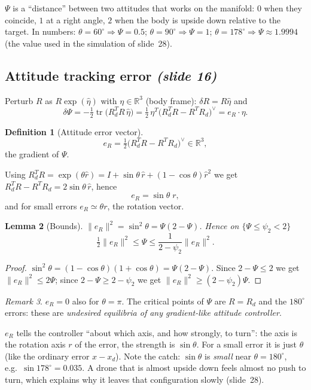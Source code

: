 \documentclass[11pt,a4paper]{article}
\newcommand{\R}{\mathbb{R}}
\newcommand{\tr}{\operatorname{tr}}
\newcommand{\hatm}[1]{\widehat{#1}}          %
\newcommand{\VEE}{^{\vee}}
\newcommand{\eR}{e_R}
\newcommand{\sli}[1]{\emph{(#1)}}
\theoremstyle{definition}
\newtheorem{definition}{Definition}[section]
\theoremstyle{plain}
\newtheorem{lemma}[definition]{Lemma}
\theoremstyle{remark}
\newtheorem{remark}[definition]{Remark}
\begin{document}
\begin{intuition}
$\Psi$ is a ``distance'' between two attitudes that works on the manifold: $0$ when they coincide, $1$ at a right angle, $2$ when the body is upside down relative to the target. In numbers: $\theta=60^\circ\Rightarrow\Psi=0.5$; $\theta=90^\circ\Rightarrow\Psi=1$; $\theta=178^\circ\Rightarrow\Psi\approx1.9994$ (the value used in the simulation of slide~28).
\end{intuition}

\subsection{Attitude tracking error \sli{slide 16}}
\label{sec:eR}

Perturb $R$ as $R\exp(\hatm\eta)$ with $\eta\in\R^3$ (body frame): $\delta R=R\hatm\eta$ and
\[
\delta\Psi=-\tfrac12\tr\big(R_d^TR\,\hatm\eta\big)=\tfrac12\,\eta^T\big(R_d^TR-R^TR_d\big)\VEE=\eR\cdot\eta .
\]

\begin{definition}[Attitude error vector]
\[
\eR=\tfrac12\big(R_d^TR-R^TR_d\big)\VEE\in\R^3 ,
\]
the gradient of $\Psi$.
\end{definition}

Using $R_d^TR=\exp(\theta\hatm r)=I+\sin\theta\,\hatm r+(1-\cos\theta)\hatm r^2$ we get $R_d^TR-R^TR_d=2\sin\theta\,\hatm r$, hence
\[
\eR=\sin\theta\;r ,
\]
and for small errors $\eR\simeq\theta r$, the rotation vector.

\begin{lemma}[Bounds]
$\|\eR\|^2=\sin^2\theta=\Psi(2-\Psi)$. Hence on $\{\Psi\le\psi_2<2\}$
\[
\tfrac12\|\eR\|^2\le\Psi\le\frac1{2-\psi_2}\|\eR\|^2 .
\]
\end{lemma}
\begin{proof}
$\sin^2\theta=(1-\cos\theta)(1+\cos\theta)=\Psi(2-\Psi)$. Since $2-\Psi\le2$ we get $\|\eR\|^2\le2\Psi$; since $2-\Psi\ge2-\psi_2$ we get $\|\eR\|^2\ge(2-\psi_2)\Psi$.
\end{proof}

\begin{remark}
$\eR=0$ also for $\theta=\pi$. The critical points of $\Psi$ are $R=R_d$ and the $180^\circ$ errors: these are \emph{undesired equilibria of any gradient-like attitude controller}.
\end{remark}

\begin{intuition}
$\eR$ tells the controller ``about which axis, and how strongly, to turn'': the axis is the rotation axis $r$ of the error, the strength is $\sin\theta$. For a small error it is just $\theta$ (like the ordinary error $x-x_d$). Note the catch: $\sin\theta$ is \emph{small} near $\theta=180^\circ$, e.g.\ $\sin178^\circ=0.035$. A drone that is almost upside down feels almost no push to turn, which explains why it leaves that configuration slowly (slide~28).
\end{intuition}
\end{document}
